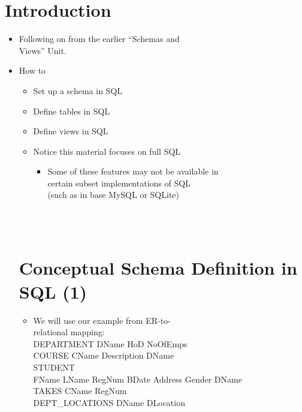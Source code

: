 \documentclass[12pt]{article}
\begin{document}
\section{Introduction}
\begin{itemize}
  \item Following on from the earlier “Schemas and \\ 
Views” Unit.\\ 
  \item How to\\ 
\begin{itemize}
  \item Set up a schema in SQL\\ 
  \item Define tables in SQL\\ 
  \item Define views in SQL\\ 
\end{itemize}
\begin{itemize}
  \item Notice this material focuses on full SQL\\ 
\begin{itemize}
  \item Some of these features may not be available in \\ 
certain subset implementations of SQL\\ 
(such as in base MySQL or SQLite)\\ 
\end{itemize}
\end{itemize}
\\ 
 \\ 
\section{Conceptual Schema Definition in SQL (1)}
\begin{itemize}
  \item We will use our example from ER-to-\\ 
relational mapping:\\ 
DEPARTMENT DName HoD NoOfEmps\\ 
COURSE CName Description DName\\ 
STUDENT\\ 
FName LName RegNum BDate Address Gender DName\\ 
TAKES CName RegNum\\ 
DEPT_LOCATIONS DName DLocation\\ 
\end{itemize}
\\ 
 \\ 

\end{itemize}
\end{document}
